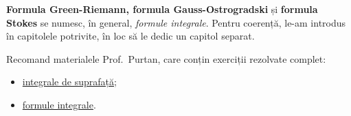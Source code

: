 \textbf{Formula Green-Riemann, formula Gauss-Ostrogradski} și \textbf{formula Stokes}
se numesc, în general, \emph{formule integrale}. Pentru coerență,
le-am introdus în capitolele potrivite, în loc să le dedic un capitol separat.

Recomand materialele Prof.\ Purtan, care conțin exerciții rezolvate complet:
\begin{itemize}
    \item \href{https://adrianmanea.xyz/docs/18-19-etti-am1/purtan-int-sup.pdf}{integrale de suprafață};
    \item \href{https://adrianmanea.xyz/docs/18-19-etti-am1/purtan-f-int.pdf}{formule integrale}.
\end{itemize}


